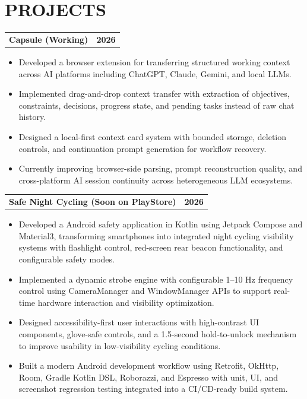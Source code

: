 \documentclass[letterpaper,11pt]{article}
\makeatletter
\newcommand{\resumeItem}[1]{
  \item{
    {#1 \vspace{-2pt}}
  }
}
\newcommand{\resumeProjectHeading}[2]{
    \item %
    \begin{tabular*}{1.001\textwidth}{l@{\extracolsep{\fill}}r}
      \small#1 & \textbf{\small #2}\\
    \end{tabular*}\vspace{-8pt} %
}
\newcommand{\resumeItemListStart}{\begin{itemize}[itemsep=2pt]}
\newcommand{\resumeItemListEnd}{\end{itemize}\vspace{-5pt}}
\makeatother
\begin{document}
\resumeSubHeadingListEnd



\section{PROJECTS}

    \resumeProjectListStart
    
\resumeProjectHeading
    {\textbf{Capsule (Working)}}{2026}
    \resumeItemListStart
        
        \resumeItem{Developed a browser extension for transferring structured working context across AI platforms including ChatGPT, Claude, Gemini, and local LLMs.}
        
        \resumeItem{Implemented drag-and-drop context transfer with extraction of objectives, constraints, decisions, progress state, and pending tasks instead of raw chat history.}
        
        \resumeItem{Designed a local-first context card system with bounded storage, deletion controls, and continuation prompt generation for workflow recovery.}
        
        \resumeItem{Currently improving browser-side parsing, prompt reconstruction quality, and cross-platform AI session continuity across heterogeneous LLM ecosystems.}

    \resumeItemListEnd
     \resumeProjectHeading
        {\textbf{Safe Night Cycling (Soon on PlayStore)}}{2026}
        \resumeItemListStart
                \resumeItem{Developed a Android safety application in Kotlin using Jetpack Compose and Material3, transforming smartphones into integrated night cycling visibility systems with flashlight control, red-screen rear beacon functionality, and configurable safety modes.}
        
                \resumeItem{Implemented a dynamic strobe engine with configurable 1--10 Hz frequency control using CameraManager and WindowManager APIs to support real-time hardware interaction and visibility optimization.}
            
                \resumeItem{Designed accessibility-first user interactions with high-contrast UI components, glove-safe controls, and a 1.5-second hold-to-unlock mechanism to improve usability in low-visibility cycling conditions.}
            
                \resumeItem{Built a modern Android development workflow using Retrofit, OkHttp, Room, Gradle Kotlin DSL, Roborazzi, and Espresso with unit, UI, and screenshot regression testing integrated into a CI/CD-ready build system.}
        \resumeItemListEnd
        
\end{document}
